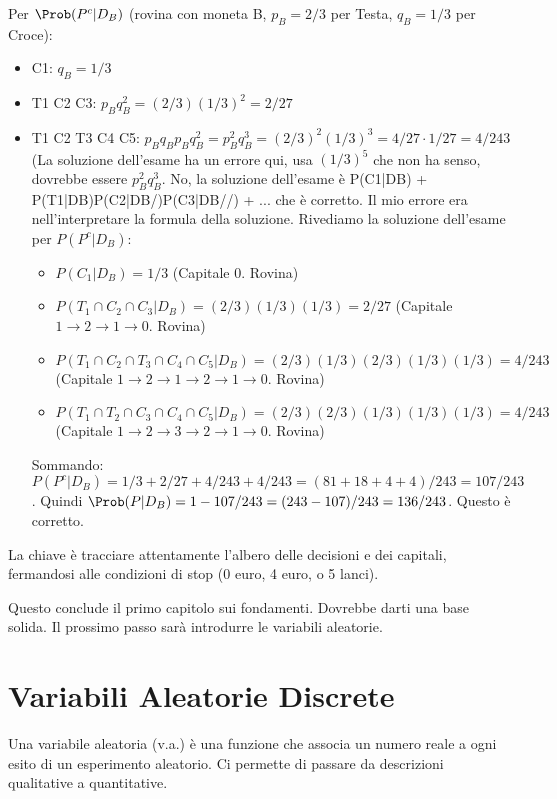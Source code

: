 \begin{example}
Per $\Prob(P^c|D_B)$ (rovina con moneta B, $p_B=2/3$ per Testa, $q_B=1/3$ per Croce):
\begin{itemize}
    \item C1: $q_B = 1/3$
    \item T1 C2 C3: $p_B q_B^2 = (2/3)(1/3)^2 = 2/27$
    \item T1 C2 T3 C4 C5: $p_B q_B p_B q_B^2 = p_B^2 q_B^3 = (2/3)^2 (1/3)^3 = 4/27 \cdot 1/27 = 4/243$ (La soluzione dell'esame ha un errore qui, usa $(1/3)^5$ che non ha senso, dovrebbe essere $p_B^2 q_B^3$. No, la soluzione dell'esame è P(C1|DB) + P(T1|DB)P(C2|DB/)P(C3|DB//) + ... che è corretto. Il mio errore era nell'interpretare la formula della soluzione.
    Rivediamo la soluzione dell'esame per $P(P^c|D_B)$:
    \begin{itemize}
        \item $P(C_1|D_B) = 1/3$ (Capitale 0. Rovina)
        \item $P(T_1 \cap C_2 \cap C_3 | D_B) = (2/3)(1/3)(1/3) = 2/27$ (Capitale $1 \to 2 \to 1 \to 0$. Rovina)
        \item $P(T_1 \cap C_2 \cap T_3 \cap C_4 \cap C_5 | D_B) = (2/3)(1/3)(2/3)(1/3)(1/3) = 4/243$ (Capitale $1 \to 2 \to 1 \to 2 \to 1 \to 0$. Rovina)
        \item $P(T_1 \cap T_2 \cap C_3 \cap C_4 \cap C_5 | D_B) = (2/3)(2/3)(1/3)(1/3)(1/3) = 4/243$ (Capitale $1 \to 2 \to 3 \to 2 \to 1 \to 0$. Rovina)
    \end{itemize}
    Sommando: $P(P^c|D_B) = 1/3 + 2/27 + 4/243 + 4/243 = (81+18+4+4)/243 = 107/243$.
    Quindi $\Prob(P|D_B) = 1 - 107/243 = (243-107)/243 = 136/243$. Questo è corretto.
\end{itemize}
La chiave è tracciare attentamente l'albero delle decisioni e dei capitali, fermandosi alle condizioni di stop (0 euro, 4 euro, o 5 lanci).
\end{example}

Questo conclude il primo capitolo sui fondamenti. Dovrebbe darti una base solida. Il prossimo passo sarà introdurre le variabili aleatorie.


\chapter{Variabili Aleatorie Discrete}
\label{cap:va_discrete}
Una variabile aleatoria (v.a.) è una funzione che associa un numero reale a ogni esito di un esperimento aleatorio. Ci permette di passare da descrizioni qualitative a quantitative.


